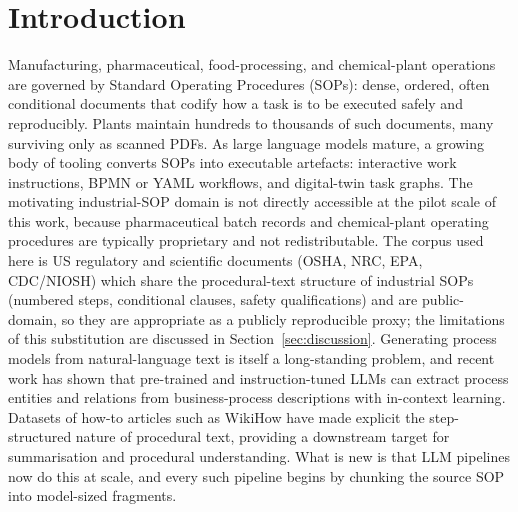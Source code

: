 \documentclass[make,article,submit,oneauthor,pdftex]{Definitions/mdpi}
\begin{document}
\section{Introduction}

Manufacturing, pharmaceutical, food-processing, and chemical-plant
operations are governed by Standard Operating Procedures (SOPs): dense,
ordered, often conditional documents that codify how a task is to be
executed safely and reproducibly. Plants maintain hundreds to thousands
of such documents, many surviving only as scanned PDFs. As large
language models mature\cite{brown2020gpt3}, a growing body of tooling
converts SOPs into executable artefacts: interactive work instructions,
BPMN or YAML workflows, and digital-twin task graphs. The motivating
industrial-SOP domain is not directly accessible at the pilot scale of
this work, because pharmaceutical batch records and chemical-plant
operating procedures are typically proprietary and not redistributable.
The corpus used here is US regulatory and scientific documents (OSHA,
NRC, EPA, CDC/NIOSH) which share the procedural-text structure of
industrial SOPs (numbered steps, conditional clauses, safety
qualifications) and are public-domain, so they are appropriate as a
publicly reproducible proxy; the limitations of this substitution are
discussed in Section~\ref{sec:discussion}. Generating
process models from natural-language text is itself a long-standing
problem\cite{friedrich2011process,vanderaa2018challenges}, and recent
work has shown that pre-trained and instruction-tuned LLMs can extract
process entities and relations from business-process descriptions with
in-context learning\cite{bellan2022extracting}. Datasets of how-to articles such as
WikiHow have made explicit the step-structured nature of procedural
text\cite{koupaee2018wikihow}, providing a downstream target for
summarisation and procedural understanding. What is new is that LLM pipelines now do
this at scale, and every such pipeline begins by chunking the source SOP
into model-sized fragments.
\end{document}
